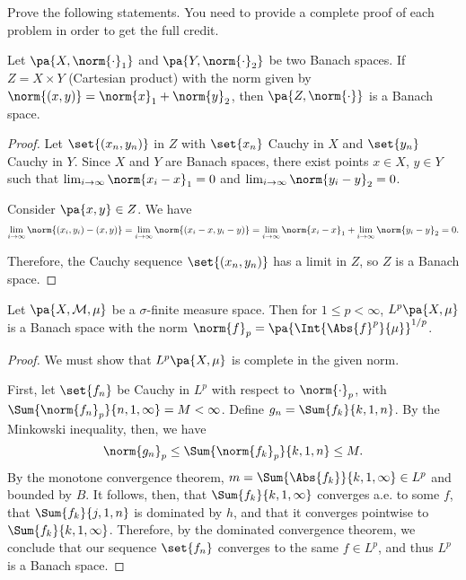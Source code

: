 \documentclass[12pt,letterpaper,twoside]{hmcpset}
\begin{document}
\noindent Prove the following statements.  You need to provide a complete proof of each problem in order to get the full credit.

\begin{problem}[1][10]
 Let $\pa{X,\norm{\cdot}_1}$ and $\pa{Y,\norm{\cdot}_2}$ be two Banach spaces. If $Z = X \times Y$ (Cartesian product) with the norm given by $\norm{(x,y)} = \norm{x}_1 + \norm{y}_2$, then $\pa{Z,\norm{\cdot}}$ is a Banach space.
\end{problem}

\begin{solution}
 \begin{proof}
  Let $\set{(x_n,y_n)}$ in $Z$ with $\set{x_n}$ Cauchy in $X$ and $\set{y_n}$ Cauchy in $Y$.  Since $X$ and $Y$ are Banach spaces, there exist points $x \in X$, $y \in Y$ such that $\lim_{i\to\infty} \norm{x_i - x}_1 = 0$ and $\lim_{i\to\infty} \norm{y_i - y}_2 = 0$.
  
  Consider $\pa{x,y} \in Z$. We have \[\lim_{i\to\infty} \norm{(x_i, y_i) - (x,y)} = \lim_{i\to\infty} \norm{(x_i - x, y_i - y)} = \lim_{i\to\infty}\norm{x_i - x}_1 + \lim_{i\to\infty} \norm{y_i - y}_2 = 0.\]
  
  Therefore, the Cauchy sequence $\set{(x_n,y_n)}$ has a limit in $Z$, so $Z$ is a Banach space.
 \end{proof}
\end{solution}


\begin{problem}[2][10]
 Let $\pa{X, \mathcal{M}, \mu}$ be a $\sigma$-finite measure space.  Then for $1 \leq p < \infty$, $L^p\pa{X,\mu}$ is a Banach space with the norm $\norm{f}_p = \pa{\Int{\Abs{f}^p}{\mu}}^{1/p}$.
\end{problem}

\begin{solution}
 \begin{proof}
  We must show that $L^p\pa{X,\mu}$ is complete in the given norm.
  
  First, let $\set{f_n}$ be Cauchy in $L^p$ with respect to $\norm{\cdot}_p$, 
with $\Sum{\norm{f_n}_p}{n,1,\infty} = M < \infty$. Define $g_n = 
\Sum{f_k}{k,1,n}$. By the Minkowski inequality, then, we have 
\[\norm{g_n}_p \leq \Sum{\norm{f_k}_p}{k,1,n} \leq M.\] By the monotone convergence theorem, $m = \Sum{\Abs{f_k}}{k,1,\infty} \in L^p$ and bounded by $B$.
It follows, then, that $\Sum{f_k}{k,1,\infty}$ converges a.e. to some $f$, that $\Sum{f_k}{j,1,n}$ is dominated by $h$, and that it converges pointwise to $\Sum{f_k}{k,1,\infty}$.
Therefore, by the dominated convergence theorem, we conclude that our sequence $\set{f_n}$ converges to the same $f \in L^p$, and thus $L^p$ is a Banach space. 
 \end{proof}
\end{solution}
\end{document}
